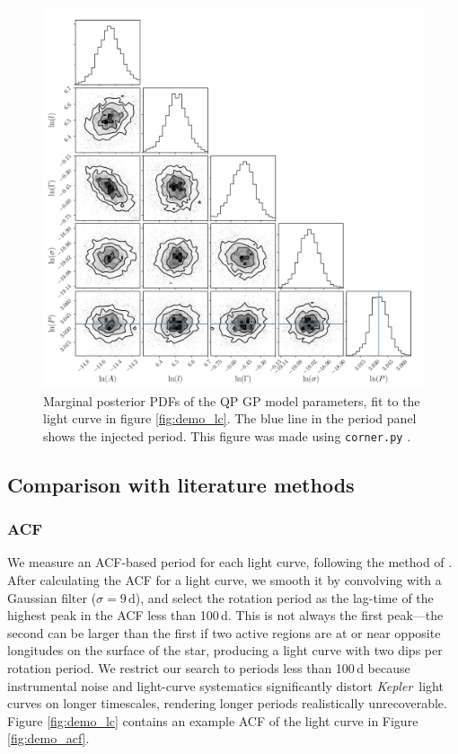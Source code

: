 \documentclass[useAMS, usenatbib, preprint, 12pt]{aastex}
\newcommand{\Kepler}{{\it Kepler}}
\newcommand{\kepler}{\Kepler}
\begin{document}
\begin{figure}
\begin{center}
\includegraphics[width=6in, clip=true]{figures/corner_plot.pdf}
\caption{Marginal posterior PDFs of the QP GP model parameters, fit to the
    light curve in figure \ref{fig:demo_lc}.
    The blue line in the period panel shows the injected period.
    This figure was made using \texttt{corner.py} \citep{Corner}.}
\label{fig:gp_posteriors}
\end{center}
\end{figure}


\subsection{Comparison with literature methods}
\label{sec:comparison}
\subsubsection{ACF}
\label{sec:acf}

We measure an ACF-based period for each light curve,
following the method of
\citet{Mcquillan2013}.
After calculating the ACF for a light curve, we smooth it by convolving with a
Gaussian filter ($\sigma=9$\,d), and select the rotation period as the
lag-time of the highest peak in the ACF less than 100\,d.
This is not always the first peak---the second can be larger than the first if
two active regions are at or near opposite longitudes on the surface of
the star, producing a light curve with two dips per rotation period.
We restrict our search to periods less than 100\,d because instrumental
noise and light-curve systematics significantly distort \kepler\ light
curves on longer timescales, rendering longer periods realistically unrecoverable.
Figure \ref{fig:demo_lc} contains an example ACF of the light curve in
Figure \ref{fig:demo_acf}.
\end{document}
